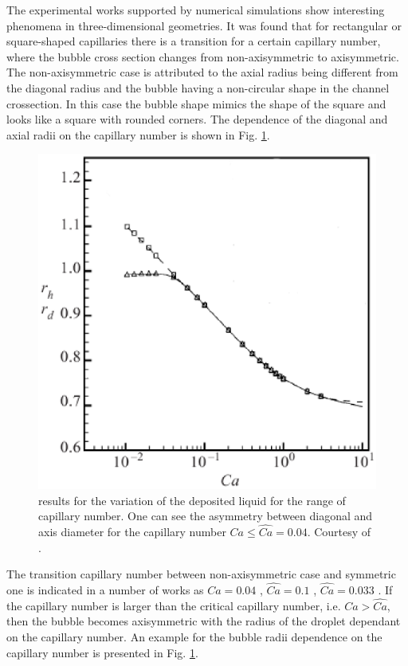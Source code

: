 \documentclass{article}
\begin{document}
The experimental works
\cite{shikazono-square,cerro-bubble-train} supported by numerical simulations \cite{heil-threedim,
wang-non-circular} show interesting phenomena in three-dimensional geometries. It was found
\cite{heil-threedim,wong-films} that for rectangular
or square-shaped capillaries there is a transition for a
certain capillary number, where the bubble cross section changes from non-axisymmetric to axisymmetric.
The non-axisymmetric case is attributed to the axial radius being 
different from the
diagonal radius and the bubble having a non-circular shape in the channel crossection. In this case
the bubble shape mimics the shape of the square and looks like a square with rounded corners. The dependence
of the diagonal and axial radii on the capillary number is shown in Fig. 
\ref{fig:heil:three:dim}.
\begin{figure}[ht]
\includegraphics[width=\textwidth]{Figures/capillary_width_heil.eps}
\caption{\citet{heil-threedim} results for the variation of the deposited liquid for the range of
capillary number. One can see the asymmetry between diagonal and axis diameter for the capillary
number $Ca\leq\hat{Ca}=0.04$. Courtesy of \citet{heil-threedim}. \label{fig:heil:three:dim}}
\end{figure}
The transition capillary number between non-axisymmetric case and symmetric one is indicated in a number of
works as $\widehat{Ca}=0.04$ \cite{cerro-bubble-train},
$\widehat{Ca}=0.1$
\cite{cerro-space,wang-non-circular}, $\widehat{Ca}=0.033$ \cite{heil-threedim}. If the capillary
number is larger
than
the critical capillary number, i.e. $Ca>\widehat{Ca}$, then the bubble becomes axisymmetric with the
radius of the droplet dependant on the capillary number. An example for the bubble radii
dependence on the capillary number is presented in Fig. \ref{fig:heil:three:dim}.
\end{document}
